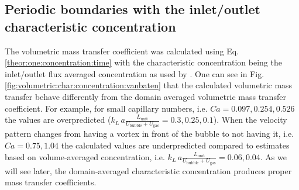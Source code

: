 \documentclass[preprint,12pt]{elsarticle}
\newcommand{\vol}{k_L\,a}
\newcommand{\lunit}{L_{\mathrm{unit}}}
\newcommand{\ububble}{U_{\mathrm{bubble}}}
\newcommand{\ugas}{U_{\mathrm{gas}}}
\newcommand{\volnondim}{\vol \frac{\lunit}{\ububble+\ugas}}
\begin{document}
\subsection{Periodic boundaries with the inlet/outlet characteristic concentration}
\label{results:periodic:inlet:outlet} 
The volumetric mass transfer coefficient
was calculated using Eq. \ref{theor:one:concentration:time} with the
characteristic concentration being the inlet/outlet flux averaged concentration
as used by \citet{vanbaten-circular}. One can see in Fig.
\ref{fig:volumetric:char:concentration:vanbaten} that the calculated volumetric mass
transfer behave differently from the domain averaged  volumetric mass
transfer coefficient. For example, for small capillary numbers, i.e.
$Ca=0.097,0.254,0.526$ the values are overpredicted
($\volnondim=0.3,0.25,0.1$). When the velocity pattern changes from having
a vortex in front of
the bubble to not having it,  i.e. $Ca=0.75,1.04$ the calculated values
are underpredicted compared to estimates based on volume-averaged concentration, i.e. $\volnondim=0.06,0.04$. As we will see later, the domain-averaged characteristic concentration produces proper mass transfer coefficients. 
\end{document}
